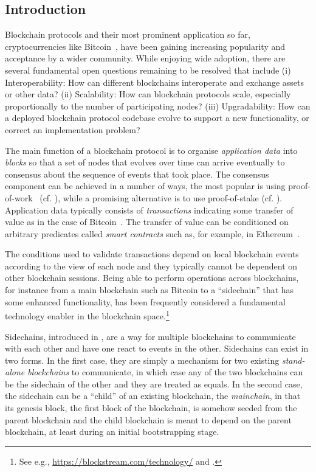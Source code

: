 \subsection{Introduction}


Blockchain protocols and their most
prominent application so far,  cryptocurrencies like Bitcoin~\cite{bitcoin},
have been gaining increasing popularity and acceptance by
a wider community.   While enjoying wide adoption,
there  are several fundamental open questions remaining to be resolved
that include (i)
         Interoperability:
           How can different blockchains interoperate and exchange
           assets or other data?
(ii)  Scalability:
           How can blockchain protocols scale, especially proportionally to the number of           participating nodes?
(iii)
         Upgradability:
           How can a deployed blockchain protocol codebase evolve to support a new
           functionality, or correct an implementation problem?

The main function of a blockchain protocol  is to organise \textit{application
data} into \textit{blocks} so that a set of nodes that evolves over time can
arrive eventually to consensus about the sequence of events that took place.
The consensus component can be achieved in a number of ways, the most popular
is using proof-of-work~\cite{C:DwoNao92} (cf. \cite{bitcoin,EC:GarKiaLeo15}),
while a promising alternative is to use proof-of-stake
(cf. \cite{algorand,C:KRDO17,EPRINT:BenPasShi16b,EC:DGKR18}).
Application data typically
consists of \textit{transactions} indicating some transfer of value as in the
case of Bitcoin~\cite{bitcoin}.  The transfer of value can be conditioned on
arbitrary predicates called \textit{smart contracts} such as, for example, in
Ethereum~\cite{buterin,wood}.

The conditions used to validate transactions %
depend on local blockchain events according to the view of each node and they
typically cannot be dependent on other blockchain sessions. Being
able to perform operations across blockchains, for instance from a main blockchain
such as Bitcoin to a ``sidechain'' that has some enhanced functionality, has been
frequently considered  a fundamental technology enabler in the blockchain space.\footnote{See
e.g., \url{https://blockstream.com/technology/} and \cite{sidechains}.  }


Sidechains, introduced in \cite{sidechains},  are a
way for multiple blockchains to communicate with each other and have one react
to events in the other. Sidechains can exist in two forms. In the first case, they are simply a mechanism for two
existing \textit{stand-alone blockchains} to communicate, in which case any of
the two blockchains can be the sidechain of the other and they are treated as
equals. In the second case, the
sidechain can be a ``child'' of an existing blockchain, the \textit{mainchain},
in that its genesis block, the first block of the blockchain, is somehow seeded
from the parent blockchain and the child blockchain is meant to depend on the
parent blockchain, at least during an initial bootstrapping stage.

